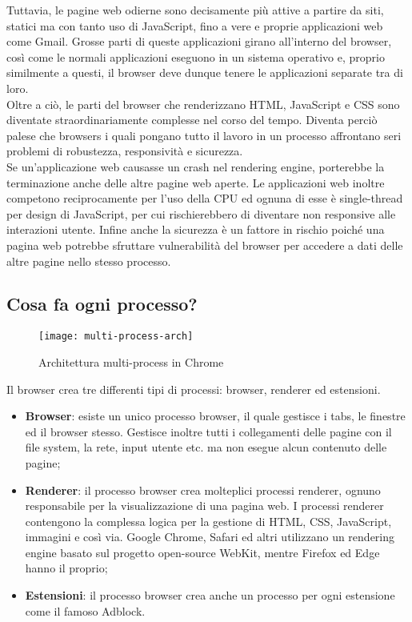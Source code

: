 Tuttavia, le pagine web odierne sono decisamente più attive a partire da siti, statici ma con tanto uso di JavaScript, fino a vere e proprie applicazioni web come Gmail. Grosse parti di queste applicazioni girano all'interno del browser, così come le normali applicazioni eseguono in un sistema operativo e, proprio similmente a questi, il browser deve dunque tenere le applicazioni separate tra di loro. \\

Oltre a ciò, le parti del browser che renderizzano HTML, JavaScript e CSS sono diventate straordinariamente complesse nel corso del tempo. Diventa perciò palese che browsers i quali pongano tutto il lavoro in un processo affrontano seri problemi di robustezza, responsività e sicurezza. \\

Se un'applicazione web causasse un crash nel rendering engine, porterebbe la terminazione anche delle altre pagine web aperte. Le applicazioni web inoltre competono reciprocamente per l'uso della CPU ed ognuna di esse è single-thread per design di JavaScript, per cui rischierebbero di diventare non responsive alle interazioni utente. Infine anche la sicurezza è un fattore in rischio poiché una pagina web potrebbe sfruttare vulnerabilità del browser per accedere a dati delle altre pagine nello stesso processo.

\subsection{Cosa fa ogni processo?}

\begin{figure}[H] 
    \centering 
    \texttt{[image: multi-process-arch]} 
    \caption{Architettura multi-process in Chrome}
\end{figure}

Il browser crea tre differenti tipi di processi: browser, renderer ed estensioni.

\begin{itemize}
    \item \textbf{Browser}: esiste un unico processo browser, il quale gestisce i tabs, le finestre ed il browser stesso. Gestisce inoltre tutti i collegamenti delle pagine con il file system, la rete, input utente etc. ma non esegue alcun contenuto delle pagine;
    \item \textbf{Renderer}: il processo browser crea molteplici processi renderer, ognuno responsabile per la visualizzazione di una pagina web. I processi renderer contengono la complessa logica per la gestione di HTML, CSS, JavaScript, immagini e così via. Google Chrome, Safari ed altri utilizzano un rendering engine basato sul progetto open-source WebKit, mentre Firefox ed Edge hanno il proprio;
    \item \textbf{Estensioni}: il processo browser crea anche un processo per ogni estensione come il famoso Adblock.
\end{itemize}

